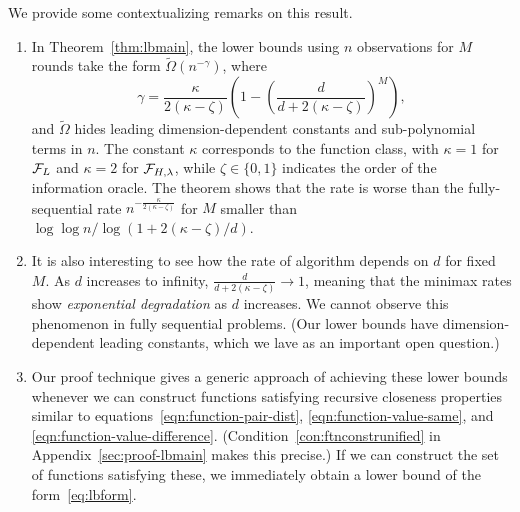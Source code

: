 We provide some contextualizing remarks on this result.
\begin{enumerate}[1.]
\item 
In Theorem~\ref{thm:lbmain}, the lower bounds
using $n$ observations
for $M$ rounds take the form $\tilde{\Omega} (n^{-\gamma})$, where
\begin{equation}
  \label{eq:lbform}
  \gamma = \frac{\kappa}{2(\kappa-\zeta)} \left(1 - \left(
    \frac{d}{d+2(\kappa-\zeta)} \right)^M\right),
\end{equation}
and $\tilde \Omega$ hides leading dimension-dependent constants and
sub-polynomial terms in $n$. The constant $\kappa$ corresponds to the
function class, with $\kappa = 1$ for $\mathcal{F}_{L}$ and $\kappa
= 2$ for $\mathcal{F}_{H,\lambda}$, while $\zeta \in \{0,1\}$
indicates the order of the information oracle.  
The theorem shows that the rate is worse than the
fully-sequential rate $n^{-\frac{\kappa}{2(\kappa-\zeta)}}$ for $M$ 
smaller than $\log \log n/\log \left(1+ 2(\kappa-\zeta)/d\right)$.


\item 
  It is also interesting to see how the rate of algorithm depends on $d$ for
  fixed $M$. As $d$ increases to infinity, $\frac{d}{d+2(\kappa-\zeta)}
  \to 1$,
  meaning that the minimax rates show \emph{exponential degradation} as $d$
  increases. We cannot observe this phenomenon in fully sequential
  problems. (Our lower bounds have dimension-dependent
  leading constants, which we lave as an important open question.)
\item 
  Our proof technique gives a generic approach of achieving these lower
  bounds whenever we can construct functions satisfying recursive closeness
  properties similar to equations~\eqref{eqn:function-pair-dist},
  \eqref{eqn:function-value-same}, and
  \eqref{eqn:function-value-difference}.
  (Condition~\ref{con:ftnconstrunified} in Appendix~\ref{sec:proof-lbmain}
  makes this precise.) If we can construct the set of functions satisfying
  these, we immediately obtain a lower bound of the form~\eqref{eq:lbform}.
\end{enumerate}

